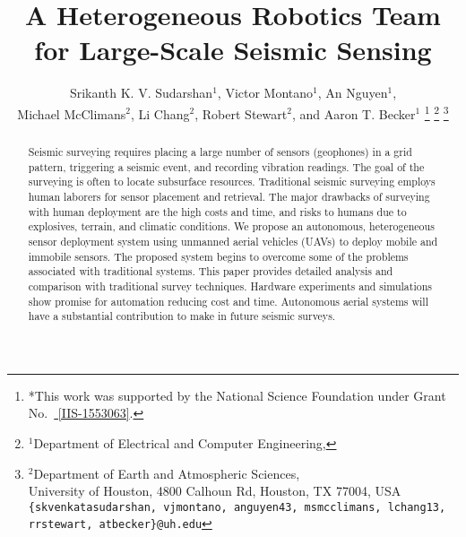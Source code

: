 \documentclass[letterpaper, 10 pt, conference]{ieeeconf}
\begin{document}
%
\title{\LARGE \bf A Heterogeneous Robotics Team for Large-Scale Seismic Sensing} 

\author{Srikanth K. V. Sudarshan$^{1}$,
Victor Montano$^{1}$,
An Nguyen$^{1}$,\\ 
Michael McClimans$^{2}$,
Li Chang$^{2}$,
Robert Stewart$^{2}$, and
 Aaron T. Becker$^{1}$%
\thanks{*This work was supported by the National Science Foundation under Grant No.\ \href{http://nsf.gov/awardsearch/showAward?AWD_ID=1553063}{ [IIS-1553063]}.}%
\thanks{$^{1}$Department of Electrical and Computer Engineering,}
\thanks{$^{2}$Department of Earth and Atmospheric Sciences,\\ University of Houston, 4800 Calhoun Rd, Houston, TX 77004, USA
        {\tt\small \{skvenkatasudarshan, vjmontano, anguyen43, msmcclimans, lchang13, rrstewart, atbecker\}@uh.edu}}%
}



\maketitle
\thispagestyle{empty}
\pagestyle{empty}


\begin{abstract} 
Seismic surveying requires placing a large number of sensors (geophones) in a grid pattern, triggering a seismic event, and recording vibration readings. 
 The goal of the surveying is often to locate subsurface resources.  
Traditional seismic surveying employs human laborers for sensor placement and retrieval. 
The major drawbacks of surveying with human deployment are the high costs and time, and risks to humans due to explosives, terrain, and climatic conditions.
We propose an autonomous, heterogeneous sensor deployment system using unmanned aerial vehicles (UAVs) to deploy mobile and immobile sensors.
The proposed system begins to overcome some of the problems associated with traditional systems.  
This paper provides detailed analysis and comparison with traditional survey techniques. 
Hardware experiments and simulations show promise for automation reducing cost and time. 
 Autonomous aerial systems will have a substantial contribution to make in future seismic surveys. 
\end{abstract}


%

%

%

%

%

%






\end{document}
